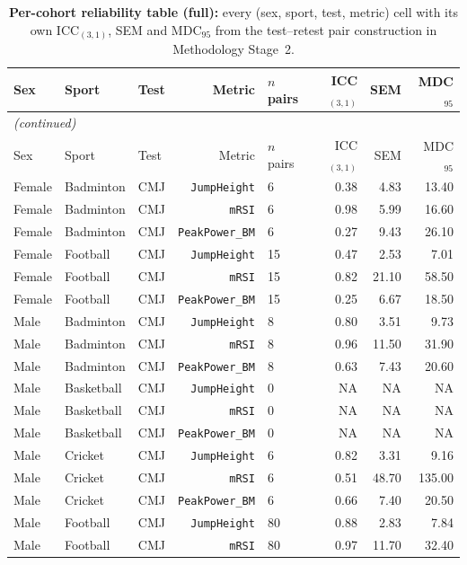 {\small
\begin{longtable}{lllrlrrr}
\caption{\textbf{Per-cohort reliability table (full):} every (sex, sport, test, metric) cell with its own ICC$_{(3,1)}$, SEM and MDC$_{95}$ from the test--retest pair construction in Methodology Stage~2.}\label{tab:reliability_full}\\
\toprule
Sex & Sport & Test & Metric & $n$ pairs & ICC$_{(3,1)}$ & SEM & MDC$_{95}$ \\
\midrule
\endfirsthead
\multicolumn{8}{l}{\emph{(continued)}} \\
\toprule
Sex & Sport & Test & Metric & $n$ pairs & ICC$_{(3,1)}$ & SEM & MDC$_{95}$ \\
\midrule
\endhead
\bottomrule
\endfoot
Female & Badminton & CMJ & \texttt{JumpHeight} & 6 & 0.38 & 4.83 & 13.40 \\
Female & Badminton & CMJ & \texttt{mRSI} & 6 & 0.98 & 5.99 & 16.60 \\
Female & Badminton & CMJ & \texttt{PeakPower\_BM} & 6 & 0.27 & 9.43 & 26.10 \\
Female & Football & CMJ & \texttt{JumpHeight} & 15 & 0.47 & 2.53 & 7.01 \\
Female & Football & CMJ & \texttt{mRSI} & 15 & 0.82 & 21.10 & 58.50 \\
Female & Football & CMJ & \texttt{PeakPower\_BM} & 15 & 0.25 & 6.67 & 18.50 \\
Male & Badminton & CMJ & \texttt{JumpHeight} & 8 & 0.80 & 3.51 & 9.73 \\
Male & Badminton & CMJ & \texttt{mRSI} & 8 & 0.96 & 11.50 & 31.90 \\
Male & Badminton & CMJ & \texttt{PeakPower\_BM} & 8 & 0.63 & 7.43 & 20.60 \\
Male & Basketball & CMJ & \texttt{JumpHeight} & 0 & NA & NA & NA \\
Male & Basketball & CMJ & \texttt{mRSI} & 0 & NA & NA & NA \\
Male & Basketball & CMJ & \texttt{PeakPower\_BM} & 0 & NA & NA & NA \\
Male & Cricket & CMJ & \texttt{JumpHeight} & 6 & 0.82 & 3.31 & 9.16 \\
Male & Cricket & CMJ & \texttt{mRSI} & 6 & 0.51 & 48.70 & 135.00 \\
Male & Cricket & CMJ & \texttt{PeakPower\_BM} & 6 & 0.66 & 7.40 & 20.50 \\
Male & Football & CMJ & \texttt{JumpHeight} & 80 & 0.88 & 2.83 & 7.84 \\
Male & Football & CMJ & \texttt{mRSI} & 80 & 0.97 & 11.70 & 32.40 \\

\end{longtable}}
